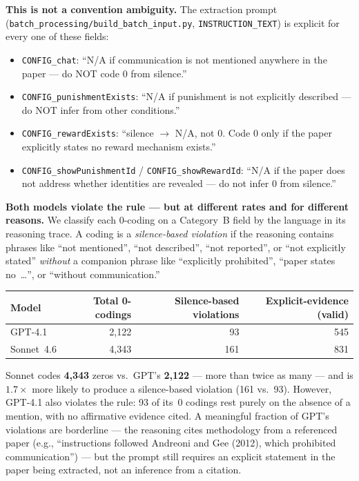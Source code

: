 \documentclass[11pt,a4paper]{article}
\begin{document}
\textbf{This is not a convention ambiguity.}  The extraction prompt
(\texttt{batch\_processing/build\_batch\_input.py}, \texttt{INSTRUCTION\_TEXT})
is explicit for every one of these fields:
\begin{itemize}
  \item \texttt{CONFIG\_chat}: ``N/A if communication is not mentioned
    anywhere in the paper --- do NOT code 0 from silence.''
  \item \texttt{CONFIG\_punishmentExists}: ``N/A if punishment is not
    explicitly described --- do NOT infer from other conditions.''
  \item \texttt{CONFIG\_rewardExists}: ``silence $\rightarrow$ N/A, not 0.
    Code 0 only if the paper explicitly states no reward mechanism exists.''
  \item \texttt{CONFIG\_showPunishmentId} / \texttt{CONFIG\_showRewardId}:
    ``N/A if the paper does not address whether identities are revealed ---
    do not infer 0 from silence.''
\end{itemize}

\textbf{Both models violate the rule --- but at different rates and
for different reasons.}  We classify each 0-coding on a Category~B
field by the language in its reasoning trace.  A coding is a
\emph{silence-based violation} if the reasoning contains phrases like
``not mentioned'', ``not described'', ``not reported'', or ``not
explicitly stated'' \emph{without} a companion phrase like
``explicitly prohibited'', ``paper states no~\ldots{}'', or
``without communication.''

\begin{center}\small
\begin{tabular}{lrrr}
\toprule
\textbf{Model} & \textbf{Total 0-codings} &
\textbf{Silence-based violations} &
\textbf{Explicit-evidence (valid)} \\
\midrule
GPT-4.1   & 2{,}122 & 93  & 545 \\
Sonnet~4.6 & 4{,}343 & 161 & 831 \\
\bottomrule
\end{tabular}
\end{center}

Sonnet codes \textbf{4{,}343} zeros vs.\ GPT's \textbf{2{,}122} --- more than
twice as many --- and is $1.7\times$ more likely to produce a silence-based
violation (161 vs.\ 93).  However, GPT-4.1 also violates the rule:
93 of its~0 codings rest purely on the absence of a mention, with no
affirmative evidence cited.  A meaningful fraction of GPT's violations
are borderline --- the reasoning cites methodology from a referenced
paper (e.g., ``instructions followed Andreoni and Gee (2012), which
prohibited communication'') --- but the prompt still requires an
explicit statement in the paper being extracted, not an inference from
a citation.
\end{document}
